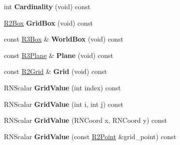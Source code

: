 \begin{DoxyCompactItemize}
\item 
int {\bfseries Cardinality} (void) const \hypertarget{class_r3_planar_grid_ac371592b17e867cf92ff459a4aeb4d95}{}\label{class_r3_planar_grid_ac371592b17e867cf92ff459a4aeb4d95}

\item 
\hyperlink{class_r2_box}{R2\+Box} {\bfseries Grid\+Box} (void) const \hypertarget{class_r3_planar_grid_a25d5431fd824ddee109f8ebfd7d74c8e}{}\label{class_r3_planar_grid_a25d5431fd824ddee109f8ebfd7d74c8e}

\item 
const \hyperlink{class_r3_box}{R3\+Box} \& {\bfseries World\+Box} (void) const \hypertarget{class_r3_planar_grid_a4329a2ec1ceccb5cd4994235ffa3717a}{}\label{class_r3_planar_grid_a4329a2ec1ceccb5cd4994235ffa3717a}

\item 
const \hyperlink{class_r3_plane}{R3\+Plane} \& {\bfseries Plane} (void) const \hypertarget{class_r3_planar_grid_a4b49d4f91d2af757c352d3cc65d07e24}{}\label{class_r3_planar_grid_a4b49d4f91d2af757c352d3cc65d07e24}

\item 
const \hyperlink{class_r2_grid}{R2\+Grid} \& {\bfseries Grid} (void) const \hypertarget{class_r3_planar_grid_a967ccc311dce498fae3bb2d52dad014b}{}\label{class_r3_planar_grid_a967ccc311dce498fae3bb2d52dad014b}

\item 
R\+N\+Scalar {\bfseries Grid\+Value} (int index) const \hypertarget{class_r3_planar_grid_a54087fc611a19c5cb0b853c6605fac27}{}\label{class_r3_planar_grid_a54087fc611a19c5cb0b853c6605fac27}

\item 
R\+N\+Scalar {\bfseries Grid\+Value} (int i, int j) const \hypertarget{class_r3_planar_grid_a0fe1a3e0e1ef4b69ad4072af2321cb9d}{}\label{class_r3_planar_grid_a0fe1a3e0e1ef4b69ad4072af2321cb9d}

\item 
R\+N\+Scalar {\bfseries Grid\+Value} (R\+N\+Coord x, R\+N\+Coord y) const \hypertarget{class_r3_planar_grid_a929a65b7f69619a1418eb737745eeb62}{}\label{class_r3_planar_grid_a929a65b7f69619a1418eb737745eeb62}

\item 
R\+N\+Scalar {\bfseries Grid\+Value} (const \hyperlink{class_r2_point}{R2\+Point} \&grid\+\_\+point) const \hypertarget{class_r3_planar_grid_a4edfa20445826dca892d324ebd256fb7}{}\label{class_r3_planar_grid_a4edfa20445826dca892d324ebd256fb7}


\end{DoxyCompactItemize}
